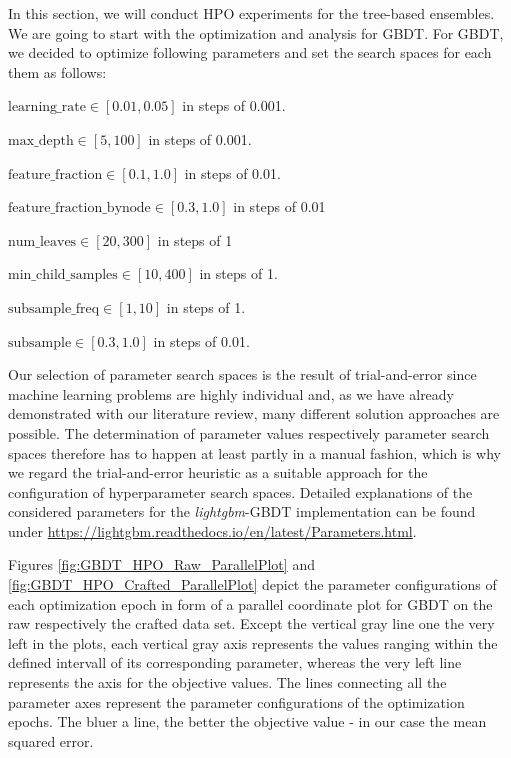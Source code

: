 In this section, we will conduct HPO experiments for the tree-based ensembles. 
We are going to start with the optimization and analysis for GBDT.
For GBDT, we decided to optimize following parameters and set the search spaces for each them as follows:
\begin{description}[font=$\bullet$\scshape\bfseries]
	\item $ \text{learning\_rate} \in [0.01, 0.05] $  in steps of 0.001.
	\item $ \text{max\_depth} \in [5, 100] $ in steps of 0.001.
	\item $ \text{feature\_fraction} \in [0.1, 1.0] $ in steps of 0.01.
	\item $ \text{feature\_fraction\_bynode} \in [0.3, 1.0] $ in steps of 0.01
	\item $ \text{num\_leaves} \in [20, 300] $ in steps of 1
	\item $ \text{min\_child\_samples} \in [10, 400] $ in steps of 1.
	\item $ \text{subsample\_freq} \in [1, 10] $ in steps of 1.
	\item $ \text{subsample} \in [0.3, 1.0] $ in steps of 0.01.
\end{description}
Our selection of parameter search spaces is the result of trial-and-error since machine learning problems are highly individual and, as we have already demonstrated with our literature review, many different solution approaches are possible. The determination of parameter values respectively parameter search spaces therefore has to happen at least partly in a manual fashion, which is why we regard the trial-and-error heuristic as a suitable approach for the configuration of hyperparameter search spaces. Detailed explanations of the considered parameters for the \textit{lightgbm}-GBDT implementation can be found under \url{https://lightgbm.readthedocs.io/en/latest/Parameters.html}.

Figures \ref{fig:GBDT_HPO_Raw_ParallelPlot} and \ref{fig:GBDT_HPO_Crafted_ParallelPlot} depict the parameter configurations of each optimization epoch in form of a parallel coordinate plot for GBDT on the raw respectively the crafted data set. Except the vertical gray line one the very left in the plots, each vertical gray axis represents the values ranging within the defined intervall of its corresponding parameter, whereas the very left line represents the axis for the objective values. The lines connecting all the parameter axes represent the parameter configurations of the optimization epochs. The bluer a line, the better the objective value - in our case the mean squared error. 


